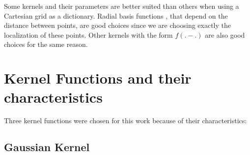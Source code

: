 Some kernels and their parameters are better suited than others when using a Cartesian grid as a dictionary. Radial basis functions \cite{buhmann_radial_2003,scholkopf_learning_2002}, that depend on the distance between points, are good choices since we are choosing exactly the localization of these points. Other kernels with the form $f(.-.)$ are also good choices for the same reason.

\section{Kernel Functions and their characteristics}

Three kernel functions were chosen for this work because of their characteristics: 

\subsection{Gaussian Kernel}

